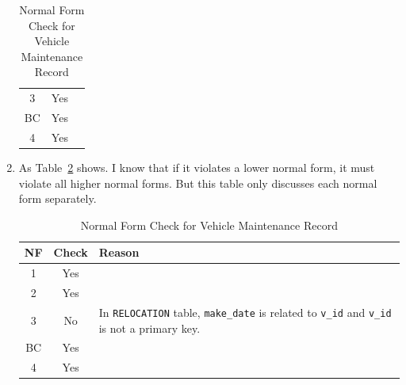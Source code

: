 \documentclass[12pt,a4paper]{article}
\begin{document}
\begin{enumerate}
\begin{table}[H]
\begin{tabular}{c c p{12cm}}
            3 & Yes &  \\
            BC & Yes &  \\
            4 & Yes &  \\
            \bottomrule
        \end{tabular}
        \caption{Normal Form Check for Vehicle Maintenance Record}
        \label{tab:NFcheck}
    \end{table}
    \item As Table~\ref{tab:NFcheck2} shows. I know that if it violates a lower normal form, it must violate all higher normal forms. But this table only discusses each normal form separately.
    \begin{table}[H]
        \centering
        \begin{tabular}{c c p{12cm}}
            \toprule
            NF & Check & Reason \\
            \midrule
            1 & Yes & \\
            2 & Yes & \\
            3 & No & In \texttt{RELOCATION} table, \texttt{make\_date} is related to \texttt{v\_id} and \texttt{v\_id} is not a primary key.\\
            BC & Yes &  \\
            4 & Yes &  \\
            \bottomrule
        \end{tabular}
        \caption{Normal Form Check for Vehicle Maintenance Record}
        \label{tab:NFcheck2}
    \end{table}
\end{enumerate}
\end{document}
